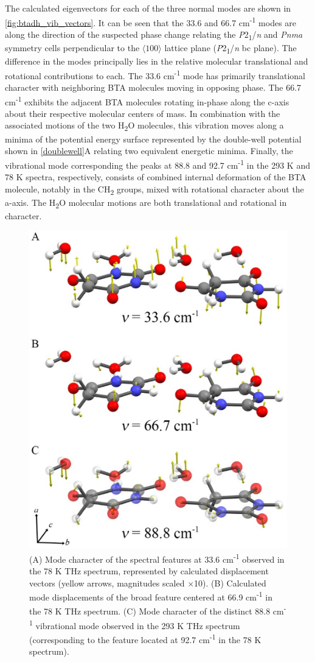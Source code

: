 The calculated eigenvectors for each of the three normal modes are shown in \autoref{fig:btadh_vib_vectors}. It can be seen that the 33.6 and 66.7 cm\textsuperscript{-1} modes are along the direction of the suspected phase change relating the \textit{P}2\textsubscript{1}/\textit{n} and \textit{Pnma} symmetry cells perpendicular to the $\langle 100 \rangle$ lattice plane (\textit{P}2\textsubscript{1}/\textit{n} bc plane). The difference in the modes principally lies in the relative molecular translational and rotational contributions to each. The 33.6 cm\textsuperscript{-1} mode has primarily translational character with neighboring BTA molecules moving in opposing phase. The 66.7 cm\textsuperscript{-1} exhibits the adjacent BTA molecules rotating in-phase along the c-axis about their respective molecular centers of mass. In combination with the associated motions of the two H\textsubscript{2}O molecules, this vibration moves along a minima of the potential energy surface represented by the double-well potential shown in \autoref{doublewell}A relating two equivalent energetic minima. Finally, the vibrational mode corresponding the peaks at 88.8 and 92.7 cm\textsuperscript{-1} in the 293 K and 78 K spectra, respectively, consists of combined internal deformation of the BTA molecule, notably in the CH\textsubscript{2} groups, mixed with rotational character about the a-axis. The H\textsubscript{2}O molecular motions are both translational and rotational in character.

\begin{figure}[h!]
    \centering
    \includegraphics[width=0.5\linewidth]{src/figures/btadh_figs/btadh_fig6.png}
    \caption{(A) Mode character of the spectral features at 33.6 cm\textsuperscript{-1} observed in the 78 K THz spectrum, represented by calculated displacement vectors (yellow arrows, magnitudes scaled ×10). (B) Calculated mode displacements of the broad feature centered at 66.9 cm\textsuperscript{-1} in the 78 K THz spectrum. (C) Mode character of the distinct 88.8 cm\textsuperscript{-1} vibrational mode observed in the 293 K THz spectrum (corresponding to the feature located at 92.7 cm\textsuperscript{-1} in the 78 K spectrum).}
    \label{fig:btadh_vib_vectors}
\end{figure}

